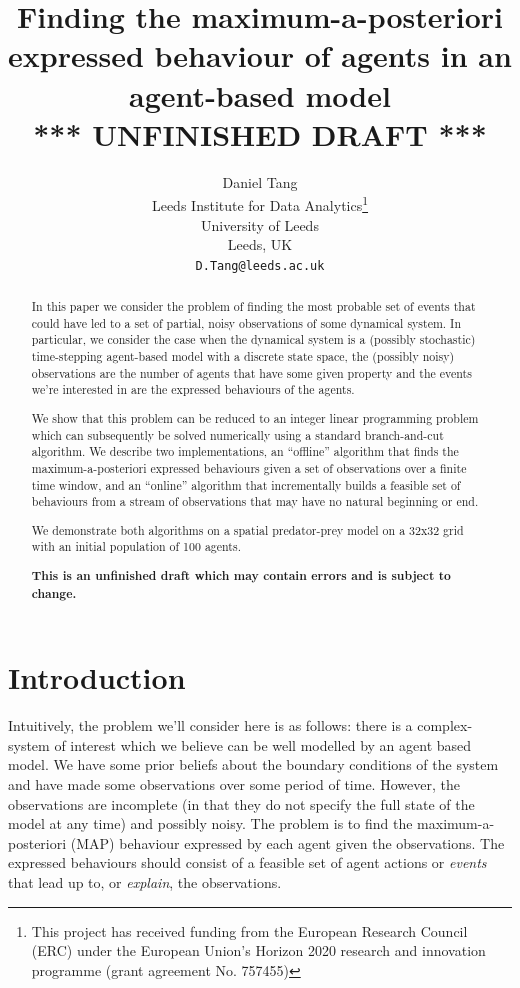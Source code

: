 \documentclass{article}
\title{Finding the maximum-a-posteriori expressed behaviour of agents in an agent-based model\\
*** UNFINISHED DRAFT ***\\
}
\author{
  Daniel Tang\\
  Leeds Institute for Data Analytics\thanks{This project has received funding from the European Research Council (ERC) under the European Union’s Horizon 2020 research and innovation programme (grant agreement No. 757455)}\\
  University of Leeds\\
  Leeds, UK\\
  \texttt{D.Tang@leeds.ac.uk} \\
}
\begin{document}
\maketitle

\begin{abstract}
In this paper we consider the problem of finding the most probable set of events that could have led to a set of partial, noisy observations of some dynamical system. In particular, we consider the case when the dynamical system is a (possibly stochastic) time-stepping agent-based model with a discrete state space, the  (possibly noisy) observations are the number of agents that have some given property and the events we're interested in are the expressed behaviours of the agents.

We show that this problem can be reduced to an integer linear programming problem which can subsequently be solved numerically using a standard branch-and-cut algorithm. We describe two implementations, an ``offline'' algorithm that finds the maximum-a-posteriori expressed behaviours given a set of observations over a finite time window, and an ``online'' algorithm that incrementally builds a feasible set of behaviours from a stream of observations that may have no natural beginning or end.

We demonstrate both algorithms on a spatial predator-prey model on a 32x32 grid with an initial population of 100 agents.

\textbf{This is an unfinished draft which may contain errors and is subject to change.}
\end{abstract}


\section{Introduction}

Intuitively, the problem we'll consider here is as follows: there is a complex-system of interest which we believe can be well modelled by an agent based model. We have some prior beliefs about the boundary conditions of the system and have made some observations over some period of time. However, the observations are incomplete (in that they do not specify the full state of the model at any time) and possibly noisy. The problem is to find the maximum-a-posteriori (MAP) behaviour expressed by each agent given the observations. The expressed behaviours should consist of a feasible set of agent actions or \textit{events} that lead up to, or \textit{explain}, the observations.
\end{document}
